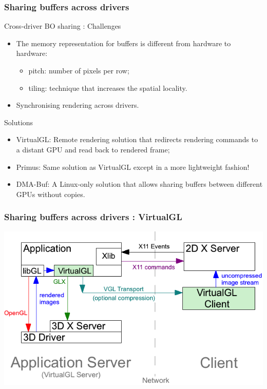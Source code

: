 \documentclass[11pt,english,compress]{beamer}
\begin{document}
\begin{frame}
	\frametitle{Sharing buffers across drivers}

	\begin{block}{Cross-driver BO sharing : Challenges}
		\begin{itemize}
			\item The memory representation for buffers is different from hardware to hardware:
			\begin{itemize}
				\item pitch: number of pixels per row;
				\item tiling: technique that increases the spatial locality.
			\end{itemize}
			\item Synchronising rendering across drivers.
		\end{itemize}
	\end{block}

	\begin{block}{Solutions}
		\begin{itemize}
			\item VirtualGL: Remote rendering solution that redirects rendering commands to a distant GPU and read back to rendered frame;
			\item Primus: Same solution as VirtualGL except in a more lightweight fashion!
			\item DMA-Buf: A Linux-only solution that allows sharing buffers between different GPUs without copies.
		\end{itemize}
	\end{block}
\end{frame}

\begin{frame}
	\frametitle{Sharing buffers across drivers : VirtualGL}

	\begin{center}
		\includegraphics[width=\linewidth]{imgs/vgltransport.png}
	\end{center}
\end{frame}
\end{document}
